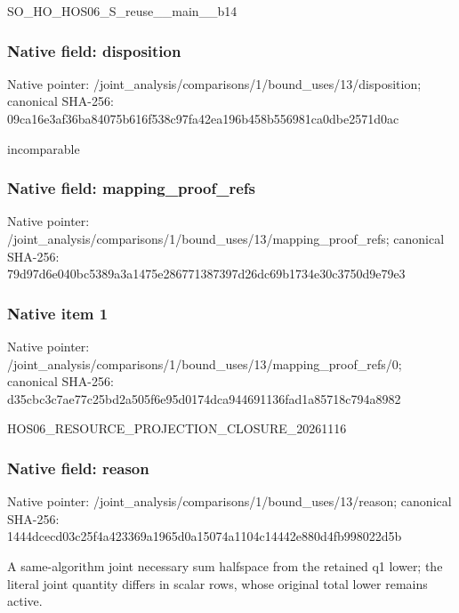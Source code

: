 \documentclass[10pt,a4paper]{article}
\begin{document}
\begingroup\raggedright\sloppy SO\_\allowbreak{}HO\_\allowbreak{}HOS06\_\allowbreak{}S\_\allowbreak{}reuse\_\allowbreak{}\_\allowbreak{}main\_\allowbreak{}\_\allowbreak{}b14\par\endgroup

\subsubsection{Native field: disposition}
Native pointer: /joint\_\allowbreak{}analysis/comparisons/1/bound\_\allowbreak{}uses/13/disposition; canonical SHA-256: 09ca16e3af36ba84075b616f538c97fa42ea196b458b556981ca0dbe2571d0ac

\begingroup\raggedright\sloppy incomparable\par\endgroup

\subsubsection{Native field: mapping\_\allowbreak{}proof\_\allowbreak{}refs}
Native pointer: /joint\_\allowbreak{}analysis/comparisons/1/bound\_\allowbreak{}uses/13/mapping\_\allowbreak{}proof\_\allowbreak{}refs; canonical SHA-256: 79d97d6e040bc5389a3a1475e286771387397d26dc69b1734e30c3750d9e79e3

\subsubsection{Native item 1}
Native pointer: /joint\_\allowbreak{}analysis/comparisons/1/bound\_\allowbreak{}uses/13/mapping\_\allowbreak{}proof\_\allowbreak{}refs/0; canonical SHA-256: d35cbc3c7ae77c25bd2a505f6e95d0174dca944691136fad1a85718c794a8982

\begingroup\raggedright\sloppy HOS06\_\allowbreak{}RESOURCE\_\allowbreak{}PROJECTION\_\allowbreak{}CLOSURE\_\allowbreak{}20261116\par\endgroup

\subsubsection{Native field: reason}
Native pointer: /joint\_\allowbreak{}analysis/comparisons/1/bound\_\allowbreak{}uses/13/reason; canonical SHA-256: 1444dcecd03c25f4a423369a1965d0a15074a1104c14442e880d4fb998022d5b

\begingroup\raggedright\sloppy A same-algorithm joint necessary sum halfspace from the retained q1 lower;\allowbreak{} the literal joint quantity differs in scalar rows,\allowbreak{} whose original total lower remains active.\par\endgroup
\end{document}
